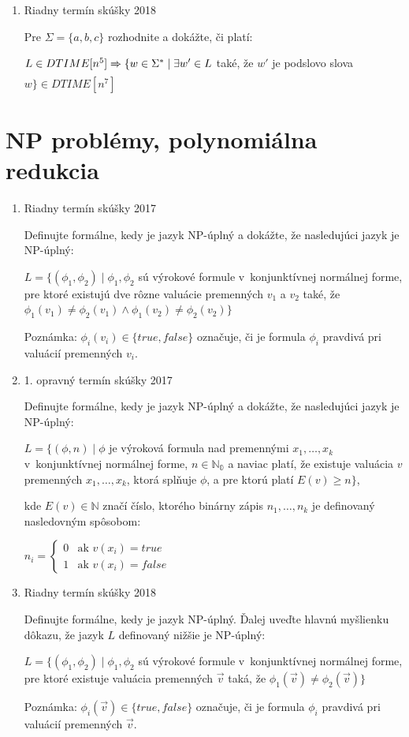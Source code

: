 \documentclass[11pt,a4paper]{article}
\begin{document}
\begin{enumerate}
		\item Riadny termín skúšky 2018

		Pre $\Sigma = \{a,b,c\}$ rozhodnite a dokážte, či platí:

		$L \in DTIME[n^5] \xRightarrow[]{} \{ w \in \Sigma^* \mid \exists w' \in L$ také, že $w'$ je podslovo slova $w\} \in DTIME[n^7]$
	\end{enumerate}

	\section{NP problémy, polynomiálna redukcia}

	\begin{enumerate}
		\item Riadny termín skúšky 2017

		Definujte formálne, kedy je jazyk NP-úplný a dokážte, že nasledujúci jazyk je NP-úplný:

		$L = \{(\phi_1, \phi_2) \mid \phi_1, \phi_2$ sú výrokové formule v~konjunktívnej normálnej forme, pre ktoré existujú dve rôzne valuácie premenných $v_1$ a $v_2$ také, že $\phi_1(v_1) \neq \phi_2(v_1) \land \phi_1(v_2) \neq \phi_2(v_2)\}$

		Poznámka: $\phi_i(v_i) \in \{true, false\}$ označuje, či je formula $\phi_i$ pravdivá pri valuácií premenných $v_i$.

		\item 1. opravný termín skúšky 2017

		Definujte formálne, kedy je jazyk NP-úplný a dokážte, že nasledujúci jazyk je NP-úplný:

		$L = \{(\phi, n) \mid \phi$ je výroková formula nad premennými $x_1, \ldots, x_k$ v~konjunktívnej normálnej forme, $n \in \mathbb{N_0}$ a naviac platí, že existuje valuácia $v$ premenných $x_1, \ldots, x_k$, ktorá splňuje $\phi$, a pre ktorú platí $E(v) \geq n\}$,

		kde $E(v) \in \mathbb{N}$ značí číslo, ktorého binárny zápis $n_1, \ldots, n_k$ je definovaný nasledovným spôsobom:

		$n_i =
		\left\{
		\begin{array}{ll}
			0  & \mbox{ak } v(x_i) = true \\
			1 & \mbox{ak } v(x_i) = false
		\end{array}
		\right.$

		\item Riadny termín skúšky 2018

		Definujte formálne, kedy je jazyk NP-úplný. Ďalej uveďte hlavnú myšlienku dôkazu, že jazyk $L$ definovaný nižšie je NP-úplný:

		$L = \{(\phi_1, \phi_2) \mid \phi_1, \phi_2$ sú výrokové formule v~konjunktívnej normálnej forme, pre ktoré existuje valuácia premenných $\vec{v}$ taká, že $\phi_1(\vec{v}) \neq \phi_2(\vec{v})\}$

		Poznámka: $\phi_i(\vec{v}) \in \{true, false\}$ označuje, či je formula $\phi_i$ pravdivá pri valuácií premenných $\vec{v}$.
	\end{enumerate}
\end{document}
